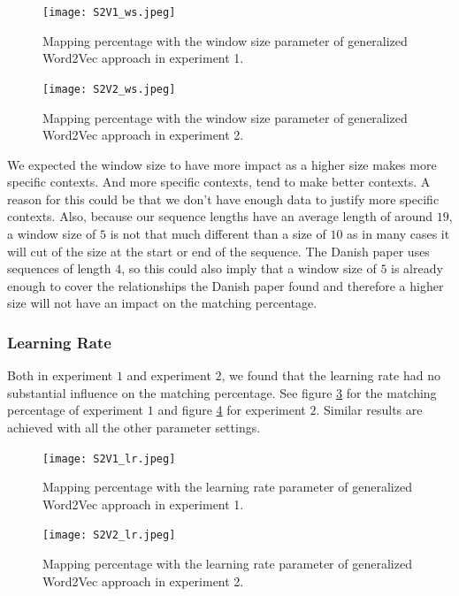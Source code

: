 \begin{figure}[!htb]
	\centering
	\texttt{[image: S2V1\_ws.jpeg]}
	\caption{Mapping percentage with the window size parameter of generalized Word2Vec approach in experiment 1.}
	\label{fig:s2v_vl_1}
\end{figure}

\begin{figure}[!htb]
	\centering
	\texttt{[image: S2V2\_ws.jpeg]}
	\caption{Mapping percentage with the window size parameter of generalized Word2Vec approach in experiment 2.}
	\label{fig:s2v_vl_2}
\end{figure}

We expected the window size to have more impact as a higher size makes more specific contexts. And more specific contexts, tend to make better contexts. A reason for this could be that we don't have enough data to justify more specific contexts. Also, because our sequence lengths have an average length of around $19$, a window size of $5$ is not that much different than a size of $10$ as in many cases it will cut of the size at the start or end of the sequence. The Danish paper uses sequences of length $4$, so this could also imply that a window size of $5$ is already enough to cover the relationships the Danish paper found and therefore a higher size will not have an impact on the matching percentage. 

\subsubsection*{Learning Rate}

Both in experiment $1$ and experiment $2$, we found that the learning rate had no substantial influence on the matching percentage. See figure \ref{fig:s2v_vl_1} for the matching percentage of experiment $1$ and figure \ref{fig:s2v_vl_2} for experiment $2$. Similar results are achieved with all the other parameter settings. \\

\begin{figure}[!htb]
	\centering
	\texttt{[image: S2V1\_lr.jpeg]}
	\caption{Mapping percentage with the learning rate parameter of generalized Word2Vec approach in experiment 1.}
	\label{fig:s2v_vl_1}
\end{figure}

\begin{figure}[!htb]
	\centering
	\texttt{[image: S2V2\_lr.jpeg]}
	\caption{Mapping percentage with the learning rate parameter of generalized Word2Vec approach in experiment 2.}
	\label{fig:s2v_vl_2}
\end{figure}

